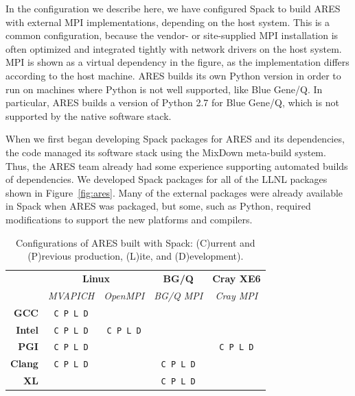 In the configuration we describe here, we have configured Spack to build ARES with
external MPI implementations, depending on the host system. This is a common
configuration, because the vendor- or site-supplied MPI installation is often
optimized and integrated tightly with network drivers on the host system. MPI is shown
as a virtual dependency in the figure, as the implementation differs according to the
host machine.  ARES builds its own Python version in order to run on machines
where Python is not well supported, like Blue Gene/Q.  In particular, ARES builds
a version of Python 2.7 for Blue Gene/Q, which is not supported by the native
software stack.

When we first began developing Spack packages for ARES and its dependencies,
the code managed its software stack using the MixDown meta-build system.
Thus, the ARES team already had some experience supporting automated builds of
dependencies. We developed Spack packages for all of the LLNL packages shown in
Figure~\ref{fig:ares}.
Many of the external packages were already available in Spack when ARES was
packaged, but some, such as Python, required modifications to support the
new platforms and compilers.

\begin{table}\centering
\begin{tabular}{|r|c|c|c|c|}
\hline
\multirow{2}{*}{} & \multicolumn{2}{|c|}{\bf Linux} & {\bf BG/Q}     & {\bf Cray XE6} \\\cline{2-5}
                  & {\it MVAPICH} & {\it OpenMPI}   & {\it BG/Q MPI} & {\it Cray MPI} \\\hline
{\bf GCC}         & {\tt C P L D} &                 &                &                \\\hline
{\bf Intel}       & {\tt C P L D} & {\tt C P L D}   &                &                \\\hline
{\bf PGI}         & {\tt C P L D} &                 &                & {\tt C P L D}  \\\hline
{\bf Clang}       & {\tt C P L D} &                 & {\tt C P L D}  &                \\\hline
{\bf XL}          &               &                 & {\tt C P L D}  &                \\\hline
\end{tabular}
\caption{
	Configurations of ARES built with Spack: \newline
	(C)urrent and
	(P)revious production, (L)ite, and (D)evelopment).
	\label{tab:ares-configs}
}
\end{table}

